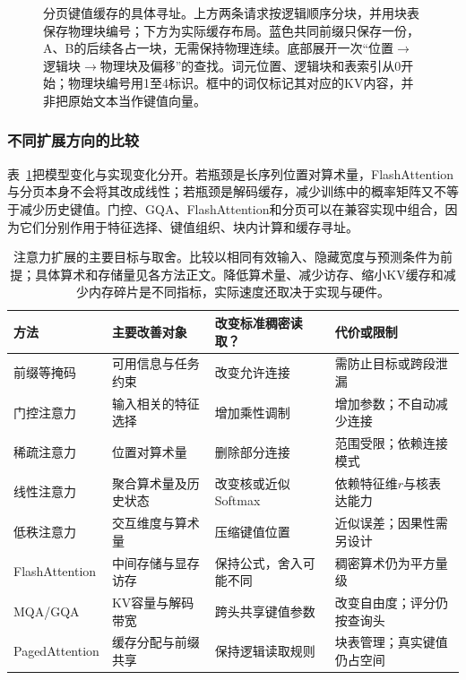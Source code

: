 \begin{figure}[htbp]
  \centering
  
  \caption{分页键值缓存的具体寻址。上方两条请求按逻辑顺序分块，并用块表保存物理块编号；下方为实际缓存布局。蓝色共同前缀只保存一份，A、B的后续各占一块，无需保持物理连续。底部展开一次“位置$\rightarrow$逻辑块$\rightarrow$物理块及偏移”的查找。词元位置、逻辑块和表索引从0开始；物理块编号用1至4标识。框中的词仅标记其对应的KV内容，并非把原始文本当作键值向量。}
  \label{fig:transformer-pagedattention}
\end{figure}
\FloatBarrier

\subsubsection{不同扩展方向的比较}

表~\ref{tab:transformer-attention-extensions}把模型变化与实现变化分开。若瓶颈是长序列位置对算术量，FlashAttention与分页本身不会将其改成线性；若瓶颈是解码缓存，减少训练中的概率矩阵又不等于减少历史键值。门控、GQA、FlashAttention和分页可以在兼容实现中组合，因为它们分别作用于特征选择、键值组织、块内计算和缓存寻址。

\begin{table}[htbp]
  \centering
  \small
  \begin{tabular}{@{}p{30mm}p{37mm}p{39mm}p{49mm}@{}}
    \toprule
    方法 & 主要改善对象 & 改变标准稠密读取？ & 代价或限制 \\
    \midrule
    前缀等掩码 & 可用信息与任务约束 & 改变允许连接 & 需防止目标或跨段泄漏 \\
    门控注意力 & 输入相关的特征选择 & 增加乘性调制 & 增加参数；不自动减少连接 \\
    稀疏注意力 & 位置对算术量 & 删除部分连接 & 范围受限；依赖连接模式 \\
    线性注意力 & 聚合算术量及历史状态 & 改变核或近似Softmax & 依赖特征维$r$与核表达能力 \\
    低秩注意力 & 交互维度与算术量 & 压缩键值位置 & 近似误差；因果性需另设计 \\
    FlashAttention & 中间存储与显存访存 & 保持公式，舍入可能不同 & 稠密算术仍为平方量级 \\
    MQA/GQA & KV容量与解码带宽 & 跨头共享键值参数 & 改变自由度；评分仍按查询头 \\
    PagedAttention & 缓存分配与前缀共享 & 保持逻辑读取规则 & 块表管理；真实键值仍占空间 \\
    \bottomrule
  \end{tabular}
  \caption{注意力扩展的主要目标与取舍。比较以相同有效输入、隐藏宽度与预测条件为前提；具体算术和存储量见各方法正文。降低算术量、减少访存、缩小KV缓存和减少内存碎片是不同指标，实际速度还取决于实现与硬件。}
  \label{tab:transformer-attention-extensions}
\end{table}
\FloatBarrier

